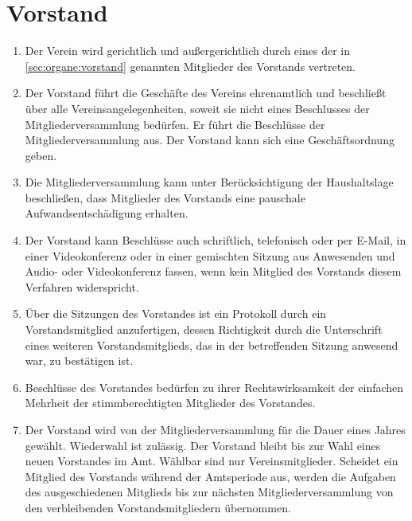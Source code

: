 \documentclass[12pt,paper=a4,ngerman]{scrreprt}
\begin{document}
	\section{Vorstand}
	\begin{enumerate}
        \item
            Der Verein wird gerichtlich und außergerichtlich durch eines der in \ref{sec:organe:vorstand} genannten Mitglieder des Vorstands vertreten.
        \item
            Der Vorstand führt die Geschäfte des Vereins ehrenamtlich und beschließt über alle Vereinsangelegenheiten, soweit sie nicht eines Beschlusses der Mitgliederversammlung bedürfen. Er führt die Beschlüsse der Mitgliederversammlung aus. Der Vorstand kann sich eine Geschäftsordnung geben.
        \item 
            Die Mitgliederversammlung kann unter Berücksichtigung der Haushaltslage beschließen, dass Mitglieder des Vorstands eine pauschale Aufwandsentschädigung erhalten.
        \item 
            Der Vorstand kann Beschlüsse auch schriftlich, telefonisch oder per E-Mail, in einer Videokonferenz oder in einer gemischten Sitzung aus Anwesenden und Audio- oder Videokonferenz fassen, wenn kein Mitglied des Vorstands diesem Verfahren widerspricht.
        \item 
            Über die Sitzungen des Vorstandes ist ein Protokoll durch ein Vorstandsmitglied anzufertigen, dessen Richtigkeit durch die Unterschrift eines weiteren Vorstandsmitglieds, das in der betreffenden Sitzung anwesend war, zu bestätigen ist.
        \item 
            Beschlüsse des Vorstandes bedürfen zu ihrer Rechtswirksamkeit der einfachen Mehrheit der stimmberechtigten Mitglieder des Vorstandes.
        \item 
            Der Vorstand wird von der Mitgliederversammlung für die Dauer eines Jahres gewählt. Wiederwahl ist zulässig. Der Vorstand bleibt bis zur Wahl eines neuen Vorstandes im Amt. Wählbar sind nur Vereinsmitglieder. Scheidet ein Mitglied des Vorstands während der Amtsperiode aus, werden die Aufgaben des ausgeschiedenen Mitglieds bis zur nächsten Mitgliederversammlung von den verbleibenden Vorstandsmitgliedern übernommen.
	\end{enumerate}
	
\end{document}
